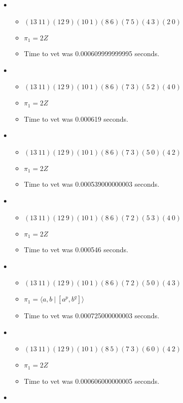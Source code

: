\documentclass{article}
\begin{document}
\begin{itemize}
\begin{itemize}
\end{itemize}
\item \begin{itemize}
      \item $(13\ 11)(12\ 9)(10\ 1)(8\ 6)(7\ 5)(4\ 3)(2\ 0)$
      \item $\pi_1 =2 Z$
      \item Time to vet was 0.000609999999995 seconds.
\end{itemize}
\item \begin{itemize}
      \item $(13\ 11)(12\ 9)(10\ 1)(8\ 6)(7\ 3)(5\ 2)(4\ 0)$
      \item $\pi_1 =2 Z$
      \item Time to vet was 0.000619 seconds.
\end{itemize}
\item \begin{itemize}
      \item $(13\ 11)(12\ 9)(10\ 1)(8\ 6)(7\ 3)(5\ 0)(4\ 2)$
      \item $\pi_1 =2 Z$
      \item Time to vet was 0.000539000000003 seconds.
\end{itemize}
\item \begin{itemize}
      \item $(13\ 11)(12\ 9)(10\ 1)(8\ 6)(7\ 2)(5\ 3)(4\ 0)$
      \item $\pi_1 =2 Z$
      \item Time to vet was 0.000546 seconds.
\end{itemize}
\item \begin{itemize}
      \item $(13\ 11)(12\ 9)(10\ 1)(8\ 6)(7\ 2)(5\ 0)(4\ 3)$
      \item $\pi_1 = \langle a,b\ |\ [a^p,b^q]\rangle$
      \item Time to vet was 0.000725000000003 seconds.
\end{itemize}
\item \begin{itemize}
      \item $(13\ 11)(12\ 9)(10\ 1)(8\ 5)(7\ 3)(6\ 0)(4\ 2)$
      \item $\pi_1 =2 Z$
      \item Time to vet was 0.000606000000005 seconds.
\end{itemize}
\item \begin{itemize}

\end{itemize}
\end{itemize}
\end{document}
